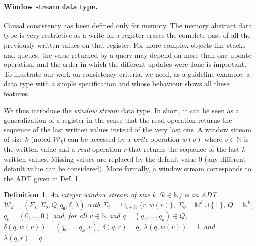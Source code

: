 \documentclass[9pt,numbers]{sigplanconf}
\newtheorem{definition}{Definition}
\begin{document}
\paragraph{Window stream data type.}
Causal consistency has been defined only for memory. The memory abstract data type is very restrictive as a write 
on a register erases the complete past of all the previously written values on that register. For more complex objects 
like stacks and queues, the value returned by a query may depend on more than one update operation, and the order 
in which the different updates were done is important. To illustrate our work on consistency criteria, we need, as a guideline example,
a data type with a simple specification and whose behaviour shows all these features.

We thus introduce the \emph{window stream} data type. In short, it can be seen as a generalization of a register in the sense that the read operation returns the sequence of the last written values instead of the very last one. A window stream of size $k$ (noted $\mathcal{W}_k)$ can be accessed by a \emph{write} operation
$w(v)$ where $v\in \mathbb{N}$ is the written value and a \emph{read} operation $r$ that returns 
the sequence of the last $k$ written values. Missing values are replaced by the 
default value $0$ (any different default value can be considered). More formally, a window stream corresponds to the ADT given in Def. \ref{def:window_reg}.

\pagebreak
\begin{definition}\label{def:window_reg} An integer \emph{window stream} of size $k$ ($k\in \mathbb{N}$) is an ADT
  $\mathcal{W}_k =  (\Sigma_i, \Sigma_o, Q, q_0, \delta, \lambda)$
  with  $\Sigma_i = \cup_{v\in \mathbb{N}}\{r, w(v)\}$, $\Sigma_o = \mathbb{N}^k \cup \{\bot\}$, $Q = \mathbb{N}^k$, $q_0 = (0, ..., 0)$ and,
  for all $v\in \mathbb{N}$ and $q = (q_1, ..., q_k) \in Q$, $\delta(q, w(v)) = (q_2, ...,  q_k, v)$, $\delta(q, r) = q$, 
  $\lambda(q, w(v)) = \bot$ and $\lambda(q, r) = q$.
\end{definition}
\end{document}
